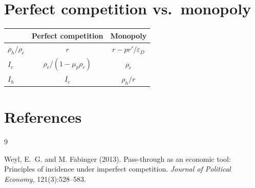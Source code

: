 \documentclass[11pt]{article}
\begin{document}
\section{Perfect competition vs.\ monopoly}

\begin{center}
\begin{tabular}{lcc}
  \hline
  & Perfect competition & Monopoly \\
  \hline
  $\rho_h/\rho_c$ & $r$ & $r-pr'/\varepsilon_D$ \\
  $I_c$ & $\rho_c/(1-\mu_p\rho_c)$ & $\rho_c$ \\
  $I_h$ & $I_c$ & $\rho_h/r$ \\
  \hline
\end{tabular}
\end{center}

\section*{References}
\begin{thebibliography}{9}

Weyl, E.~G. and M. Fabinger (2013).
\newblock Pass-through as an economic tool: Principles of incidence under
  imperfect competition.
\newblock \emph{Journal of Political Economy}, 121(3):528--583.

\end{thebibliography}
\end{document}
